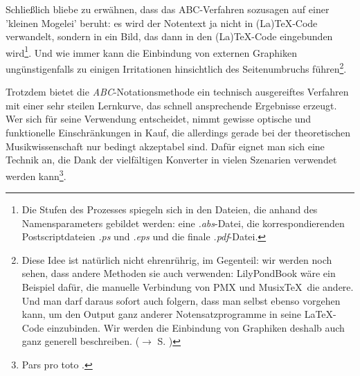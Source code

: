 Schließlich bliebe zu erwähnen, dass das ABC-Verfahren sozusagen auf einer
'kleinen Mogelei' beruht: es wird der Notentext ja nicht in (La)\TeX-Code
verwandelt, sondern in ein Bild, das dann in den (La)\TeX-Code eingebunden
wird\footnote{Die Stufen des Prozesses spiegeln sich in den Dateien, die anhand
des Namensparameters gebildet werden: eine \textit{.abs}-Datei, die
korrespondierenden Postscriptdateien \textit{.ps} und \textit{.eps} und die finale
\textit{.pdf}-Datei.}. Und wie immer kann die Einbindung von externen Graphiken
ungünstigenfalls zu einigen Irritationen hinsichtlich des Seitenumbruchs
führen\footnote{Diese Idee ist natürlich nicht ehrenrührig, im Gegenteil: wir
werden noch sehen, dass andere Methoden sie auch verwenden: LilyPondBook wäre
ein Beispiel dafür, die manuelle Verbindung von PMX und Musix\TeX\ die andere.
Und man darf daraus sofort auch folgern, dass man selbst ebenso vorgehen kann,
um den Output ganz anderer Notensatzprogramme in seine \LaTeX-Code einzubinden.
Wir werden die Einbindung von Graphiken deshalb auch ganz generell beschreiben.
($\rightarrow$ S. \pageref{IncludeGraphics})}.\label{AbcGraphics}

Trotzdem bietet die \textit{ABC}-Notationsmethode ein technisch ausgereiftes
Verfahren mit einer sehr steilen Lernkurve, das schnell ansprechende Ergebnisse
erzeugt. Wer sich für seine Verwendung entscheidet, nimmt gewisse optische und
funktionelle Einschränkungen in Kauf, die allerdings gerade bei der
theoretischen Musikwissenschaft nur bedingt akzeptabel sind.
Dafür eignet man sich eine Technik an, die Dank der vielfältigen Konverter in
vielen Szenarien verwendet werden kann\footnote{Pars pro toto
\cite[vgl.][\nopage wp]{Rosen2018a}.}.
% 

